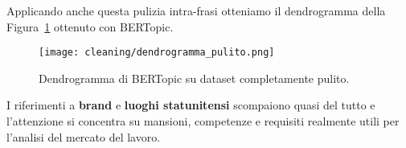 \noindent Applicando anche questa pulizia intra-frasi otteniamo il dendrogramma della Figura~\ref{fig:cleaned-dendrogram} ottenuto con BERTopic.

\begin{figure}[H]
    \centering
    \texttt{[image: cleaning/dendrogramma\_pulito.png]}
    \caption{Dendrogramma di BERTopic su dataset completamente pulito.}
    \label{fig:cleaned-dendrogram}
\end{figure}

\noindent I riferimenti a \textbf{brand} e \textbf{luoghi statunitensi} scompaiono quasi del tutto e l'attenzione si concentra su mansioni, competenze e requisiti realmente utili per l'analisi del mercato del lavoro.
